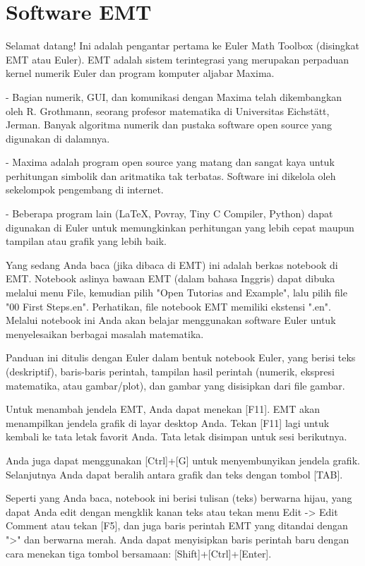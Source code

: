 \documentclass[12pt,Times new roman,letterpaper]{book}
\begin{document}
\chapter{Software EMT}
\begin{eulernootebook}   
\begin{eulercomment}
Selamat datang! Ini adalah pengantar pertama ke Euler Math Toolbox
(disingkat EMT atau Euler). EMT adalah sistem terintegrasi yang
merupakan perpaduan kernel numerik Euler dan program komputer aljabar
Maxima.

- Bagian numerik, GUI, dan komunikasi dengan Maxima telah dikembangkan
oleh R. Grothmann, seorang profesor matematika di Universitas
Eichstätt, Jerman. Banyak algoritma numerik dan pustaka software open
source yang digunakan di dalamnya.

- Maxima adalah program open source yang matang dan sangat kaya untuk
perhitungan simbolik dan aritmatika tak terbatas. Software ini
dikelola oleh sekelompok pengembang di internet.

- Beberapa program lain (LaTeX, Povray, Tiny C Compiler, Python) dapat
digunakan di Euler untuk memungkinkan perhitungan yang lebih cepat
maupun tampilan atau grafik yang lebih baik.

Yang sedang Anda baca (jika dibaca di EMT) ini adalah berkas notebook
di EMT. Notebook aslinya bawaan EMT (dalam bahasa Inggris) dapat
dibuka melalui menu File, kemudian pilih "Open Tutorias and Example",
lalu pilih file "00 First Steps.en". Perhatikan, file notebook EMT
memiliki ekstensi ".en". Melalui notebook ini Anda akan belajar
menggunakan software Euler untuk menyelesaikan berbagai masalah
matematika.
\end{eulercomment}
\begin{eulercomment}
Panduan ini ditulis dengan Euler dalam bentuk notebook Euler, yang berisi teks
(deskriptif), baris-baris perintah, tampilan hasil perintah (numerik, ekspresi
matematika, atau gambar/plot), dan gambar yang disisipkan dari file gambar.

Untuk menambah jendela EMT, Anda dapat menekan [F11]. EMT akan menampilkan
jendela grafik di layar desktop Anda. Tekan [F11] lagi untuk kembali ke tata
letak favorit Anda. Tata letak disimpan untuk sesi berikutnya.

Anda juga dapat menggunakan [Ctrl]+[G] untuk menyembunyikan jendela grafik.
Selanjutnya Anda dapat beralih antara grafik dan teks dengan tombol [TAB].

Seperti yang Anda baca, notebook ini berisi tulisan (teks) berwarna hijau, yang
dapat Anda edit dengan mengklik kanan teks atau tekan menu Edit -\textgreater{} Edit Comment
atau tekan [F5], dan juga baris perintah EMT yang ditandai dengan "\textgreater{}" dan
berwarna merah. Anda dapat menyisipkan baris perintah baru dengan cara menekan
tiga tombol bersamaan: [Shift]+[Ctrl]+[Enter].


\end{eulercomment}
\end{eulernootebook}
\end{document}
